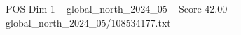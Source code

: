 \begin{textsample}{POS Dim 1 – global\_north\_2024\_05 – Score 42.00 – global\_north\_2024\_05/108534177.txt}
\end{textsample}
